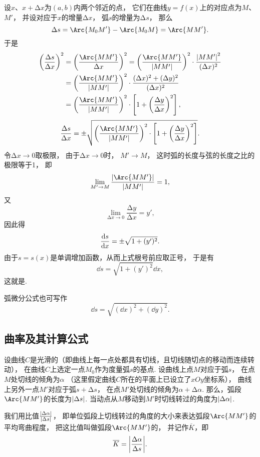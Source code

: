 设\(x\)、\(x+\increment x\)为\((a,b)\)内两个邻近的点，
它们在曲线\(y=f(x)\)上的对应点为\(M\)、\(M'\)，
并设对应于\(x\)的增量\(\increment x\)，
弧\(s\)的增量为\(\increment s\)，
那么\[
	\increment s = \Arc{M_0 M'} - \Arc{M_0 M} = \Arc{M M'}.
\]
于是\begin{align*}
	\left(\frac{\increment s}{\increment x}\right)^2
	&= \left(\frac{\Arc{M M'}}{\increment x}\right)^2
	= \left(\frac{\Arc{M M'}}{\abs{M M'}}\right)^2
		\cdot \frac{\abs{M M'}^2}{(\increment x)^2} \\
	&= \left(\frac{\Arc{M M'}}{\abs{M M'}}\right)^2
		\cdot \frac{(\increment x)^2 + (\increment y)^2}{(\increment x)^2} \\
	&= \left(\frac{\Arc{M M'}}{\abs{M M'}}\right)^2
		\cdot \left[ 1 + \left(\frac{\increment y}{\increment x}\right)^2 \right],
\end{align*}\[
\frac{\increment s}{\increment x} = \pm \sqrt{\left(\frac{\Arc{M M'}}{\abs{M M'}}\right)^2 \cdot \left[ 1 + \left(\frac{\increment y}{\increment x}\right)^2 \right]}.
\]
令\(\increment x\to0\)取极限，
由于\(\increment x\to0\)时，
\(M' \to M\)，
这时弧的长度与弦的长度之比的极限等于1，
即\[
	\lim_{M' \to M} \frac{\abs{\Arc{M M'}}}{\abs{M M'}} = 1,
\]
又\[
	\lim_{\increment x\to0} \frac{\increment y}{\increment x} = y',
\]
因此得\[
	\dv{s}{x} = \pm \sqrt{1 + (y')^2}.
\]
由于\(s = s(x)\)是单调增加函数，从而上式根号前应取正号，
于是有\begin{equation}
	\dd{s} = \sqrt{1 + (y')^2} \dd{x},
\end{equation}
这就是.

弧微分公式也可写作\begin{equation}
	\dd{s} = \sqrt{(\dd{x})^2 + (\dd{y})^2}.
\end{equation}

\subsection{曲率及其计算公式}
设曲线\(C\)是光滑的（即曲线上每一点处都具有切线，且切线随切点的移动而连续转动），
在曲线\(C\)上选定一点\(M_0\)作为度量弧\(s\)的基点.
设曲线上点\(M\)对应于弧\(s\)，
在点\(M\)处切线的倾角为\(\alpha\)
（这里假定曲线\(C\)所在的平面上已设立了\(xOy\)坐标系），
曲线上另外一点\(M'\)对应于弧\(s+\increment s\)，
在点\(M'\)处切线的倾角为\(\alpha + \increment \alpha\).
那么，弧段\(\Arc{MM'}\)的长度为\(\abs{\Delta s}\).
当动点从\(M\)移动到\(M'\)时切线转过的角度为\(\abs{\Delta \alpha}\).

我们用比值\(\frac{\abs{\Delta\alpha}}{\abs{\Delta s}}\)，
即单位弧段上切线转过的角度的大小来表达弧段\(\Arc{MM'}\)的平均弯曲程度，
把这比值叫做弧段\(\Arc{MM'}\)的，
并记作\(\overline{K}\)，即\[
	\overline{K} = \abs{\frac{\Delta\alpha}{\Delta s}}.
\]

